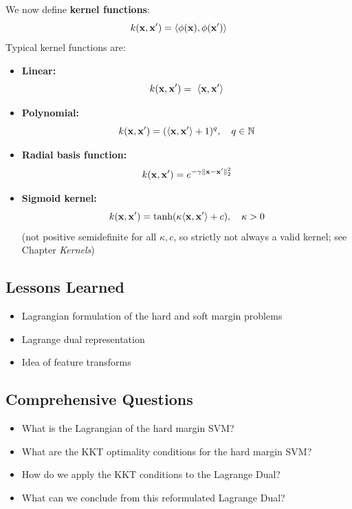   We now define \textbf{kernel functions}:
  \begin{displaymath}
    k(\bm{\mathrm{x}}, \bm{\mathrm{x}}') =  \langle \phi(\bm{\mathrm{x}}), \phi(\bm{\mathrm{x}}') \rangle
  \end{displaymath}
  Typical kernel functions are:
  \begin{itemize}
    \item \textbf{Linear:} 
      \begin{displaymath}
        k(\bm{\mathrm{x}}, \bm{\mathrm{x}}') =~ \langle\bm{\mathrm{x}}, \bm{\mathrm{x}}'\rangle
      \end{displaymath}
    \item \textbf{Polynomial:} 
      \begin{displaymath}
        k(\bm{\mathrm{x}}, \bm{\mathrm{x}}') = (\langle\bm{\mathrm{x}}, \bm{\mathrm{x}}'\rangle + 1)^q, \quad q\in\mathbb N
      \end{displaymath}
    \item \textbf{Radial basis function:} 
      \begin{displaymath}
        k(\bm{\mathrm{x}}, \bm{\mathrm{x}}') = e^{-\gamma\|\bm{\mathrm{x}}- \bm{\mathrm{x}}'\|_2^2}
      \end{displaymath}
    \item \textbf{Sigmoid kernel:} 
      \begin{displaymath}
        k(\bm{\mathrm{x}}, \bm{\mathrm{x}}') =\mbox{tanh}({ \kappa \langle\bm{\mathrm{x}}, \bm{\mathrm{x}}'\rangle + c}), \quad \kappa>0
      \end{displaymath}
      (not positive semidefinite for all $\kappa, c$, so strictly not always a valid kernel; see Chapter \emph{Kernels})
  \end{itemize}
  
\subsection{Lessons Learned}

  \begin{itemize}
    \item Lagrangian formulation of the hard and soft margin problems    
    \item Lagrange dual representation    
    \item Idea of feature transforms
  \end{itemize}

\subsection{Comprehensive Questions}

  \begin{itemize}
    \item What is the Lagrangian of the hard margin SVM? 
    \item What are the KKT optimality conditions for the hard margin SVM? 
    \item How do we apply the KKT conditions to the Lagrange Dual? 
    \item What can we conclude from this reformulated Lagrange Dual?
  \end{itemize}
  

